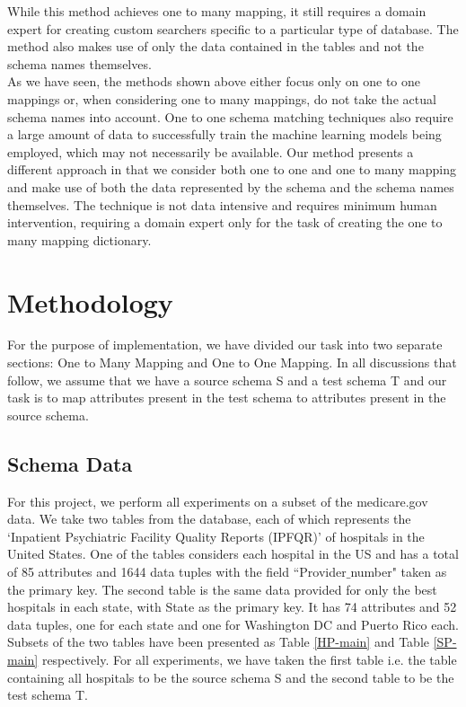 \documentclass[conference]{IEEEtran}
\begin{document}
While this method achieves one to many mapping, it still requires a domain expert for creating custom searchers specific to a particular type of database. The method also makes use of only the data contained in the tables and not the schema names themselves.\\

\noindent
As we have seen, the methods shown above either focus only on one to one mappings or, when considering one to many mappings, do not take the actual schema names into account. One to one schema matching techniques also require a large amount of data to successfully train the machine learning models being employed, which may not necessarily be available. Our method presents a different approach in that we consider both one to one and one to many mapping and make use of both the data represented by the schema and the schema names themselves. The technique is not data intensive and requires minimum human intervention, requiring a domain expert only for the task of creating the one to many mapping dictionary.


\section{Methodology}
For the purpose of implementation, we have divided our task into two separate sections: One to Many Mapping and One to One Mapping. In all discussions that follow, we assume that we have a source schema S and a test schema T and our task is to map attributes present in the test schema to attributes present in the source schema. 

\subsection{Schema Data}
For this project, we perform all experiments on a subset of the medicare.gov data. We take two tables from the database, each of which represents the ‘Inpatient Psychiatric Facility Quality Reports (IPFQR)’ of hospitals in the United States. One of the tables considers each hospital in the US and has a total of 85 attributes and 1644 data tuples with the field ``Provider$\_$number" taken as the primary key. The second table is the same data provided for only the best hospitals in each state, with State as the primary key. It has 74 attributes and 52 data tuples, one for each state and one for Washington DC and Puerto Rico each. Subsets of the two tables have been presented as Table \ref{HP-main} and Table \ref{SP-main} respectively. For all experiments, we have taken the first table i.e. the table containing all hospitals to be the source schema S and the second table to be the test schema T.
\end{document}
